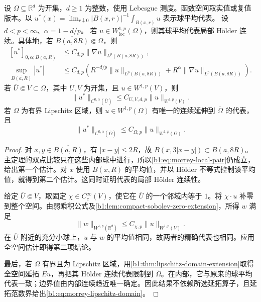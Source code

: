 \begin{corollary}\label{b1:cor:morrey-domain}
设 \(\Omega\subseteq\mathbb R^d\) 为开集，\(d\geq1\) 为整数，使用 Lebesgue 测度。函数空间取实值或复值版本。以 \(u^*(x)=\lim_{r\downarrow0}|B(x,r)|^{-1}\int_{B(x,r)}u\) 表示球平均代表。
设 \(d<p<\infty\)、\(\alpha=1-d/p\)。
若 \(u\in W^{1,p}_{\mathrm{loc}}(\Omega)\)，则其球平均代表局部 Hölder 连续。具体地，若 \(\overline{B(a,8R)}\Subset\Omega\)，则
\begin{equation}\label{b1:eq:morrey-interior-ball}
 \begin{split}
 [u^*]_{0,\alpha;\overline{B(a,R)}}
 &\le C_{d,p}\|\nabla u\|_{L^p(B(a,8R))},\\
 \sup_{\overline{B(a,R)}}|u^*|
 &\le C_{d,p}\left(
        R^{-d/p}\|u\|_{L^p(B(a,8R))}
        +R^\alpha\|\nabla u\|_{L^p(B(a,8R))}\right).
 \end{split}
\end{equation}
若 \(\overline U\Subset V\subset\Omega\)，其中 \(U,V\) 为开集，且 \(u\in W^{1,p}(V)\)，则
\[
 \|u^*\|_{C^{0,\alpha}(\overline U)}
 \le C_{U,V,d,p}\|u\|_{W^{1,p}(V)}.
\]
若 \(\Omega\) 为有界 Lipschitz 区域，则 \(u\in W^{1,p}(\Omega)\) 有唯一的连续延伸到 \(\overline\Omega\) 的代表，且
\begin{equation}\label{b1:eq:morrey-lipschitz-domain}
 \|u^*\|_{C^{0,\alpha}(\overline\Omega)}
 \le C_{\Omega,p}\|u\|_{W^{1,p}(\Omega)}.
\end{equation}
\end{corollary}
\begin{proof}
对 \(x,y\in\overline{B(a,R)}\)，有 \(|x-y|\le2R\)，故
\(B(x,3|x-y|)\subset B(a,8R)\)。主定理的双点比较只在这些内部球中进行，所以\eqref{b1:eq:morrey-local-pair}仍成立，给出第一个估计。对 \(x\) 使用 \(B(x,R)\) 的平均值，并以 Hölder 不等式控制该平均值，就得到第二个估计。这同时证明代表的局部 Hölder 连续性。

给定 \(\overline U\Subset V\)，取固定 \(\chi\in C_c^\infty(V)\)，使它在 \(\overline U\) 的一个邻域内等于 \(1\)。将 \(\chi\cdot u\) 补零到整个空间。由弱乘积公式及\cref{b1:lem:compact-sobolev-zero-extension}，所得 \(w\) 满足
\[
 \|w\|_{W^{1,p}(\mathbb R^d)}
 \le C_{\chi,p}\|u\|_{W^{1,p}(V)}.
\]
在 \(\overline U\) 附近的充分小球上，\(u\) 与 \(w\) 的平均值相同，故两者的精确代表也相同。应用全空间估计即得第二项结论。

最后，若 \(\Omega\) 有界且为 Lipschitz 区域，用\cref{b1:thm:lipschitz-domain-extension}取得全空间延拓 \(Eu\)，再把其 Hölder 连续代表限制到 \(\overline\Omega\)。在内部，它与原来的球平均代表一致；边界值由内部连续趋近唯一确定。因此结果不依赖所选延拓算子，且延拓范数界给出\eqref{b1:eq:morrey-lipschitz-domain}。
\end{proof}


